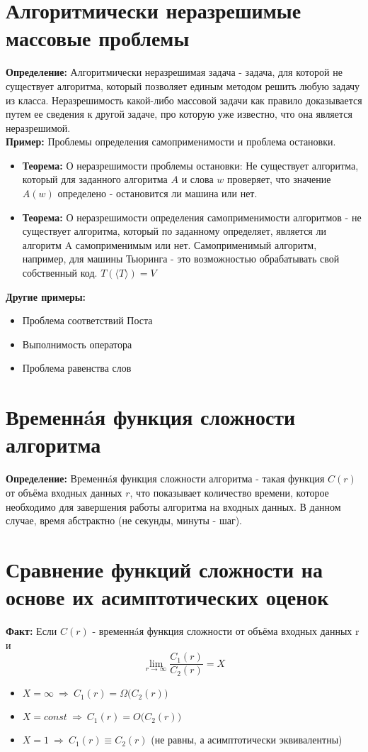 \documentclass[../main.tex]{subfiles}
\begin{document}
\section{Алгоритмически неразрешимые массовые проблемы}
\textbf{Определение:
} Алгоритмически неразрешимая задача - задача, для которой не существует алгоритма, который позволяет единым методом решить любую задачу из класса. Неразрешимость какой-либо массовой задачи как правило доказывается путем ее сведения к другой задаче, про которую уже известно, что она является неразрешимой. \\
\textbf{Пример:
} Проблемы определения самоприменимости и проблема остановки.
\begin{itemize}
	\item \textbf{Теорема:
	} О неразрешимости проблемы остановки:  Не существует алгоритма, который для заданного алгоритма $A$ и слова $w$ проверяет, что значение $A(w)$ определено - остановится ли машина или нет.
	\item \textbf{Теорема:	
	} О неразрешимости определения самоприменимости алгоритмов - не существует алгоритма, который по заданному определяет, является ли алгоритм A самоприменимым или нет. Самоприменимый алгоритм, например, для машины Тьюринга - это возможностью обрабатывать свой собственный код. $ T(\langle T \rangle) = V $
\end{itemize}
\textbf{Другие примеры:
} \begin{itemize}
	\item Проблема соответствий Поста
	\item Выполнимость оператора
	\item Проблема равенства слов
\end{itemize}

%
\section{Временнáя функция сложности алгоритма}
\textbf{Определение:
} Временнáя функция сложности алгоритма - такая функция $C(r)$ от объёма входных данных $r$, что показывает количество времени, которое
необходимо для завершения работы алгоритма на входных данных. В данном случае, время абстрактно (не секунды, минуты - шаг).

%
\section{Сравнение функций сложности на основе их асимптотических оценок}
\textbf{Факт:
} Если $C(r)$ - временнáя функция сложности от объёма входных данных r и 
\[\lim_{r \to \infty }{\frac{C_1(r)}{C_2(r)}} = X\]
\begin{itemize}
	\item $X = \infty \ \Rightarrow \ C_1(r) = \Omega \bigl(C_2(r)\bigr)$
	\item $X = \textit{const} \ \Rightarrow \ C_1(r) = O \bigl(C_2(r)\bigr)$
	\item $X = \textit{1} \ \Rightarrow \ C_1(r) \equiv C_2(r)$ (не равны, а асимптотически эквивалентны)
\end{itemize}
\end{document}
